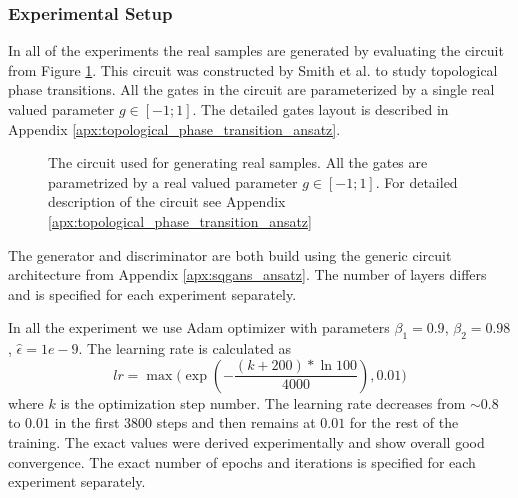 \subsubsection{Experimental Setup}
In all of the experiments the real samples are generated by evaluating the
circuit from Figure \ref{fig:phase_circuit_small}. This circuit was constructed
by Smith et al. \cite{smith2020crossing} to study topological phase transitions.
All the gates in the circuit are parameterized by a single real valued parameter
$g \in [-1;1]$. The detailed gates layout is described in Appendix \ref{apx:topological_phase_transition_ansatz}.
\begin{figure}[htbp!]
  \caption{The circuit used for generating real samples. All the gates are
    parametrized by a real valued parameter $g \in [-1; 1]$. For detailed
    description of the circuit see Appendix
    \ref{apx:topological_phase_transition_ansatz} \label{fig:phase_circuit_small}}
\end{figure}

The generator and discriminator are both build using the generic circuit
architecture from Appendix \ref{apx:sqgans_ansatz}. The number of layers differs
and is specified for each experiment separately.

In all the experiment we use Adam optimizer \cite{kingma2017adam} with
parameters $\beta_1 = 0.9$, $\beta_2=0.98$, $\hat{\epsilon} = 1e-9$. The
learning rate is calculated as
\begin{equation}
lr = \max{(\exp{(-\frac{(k+200) * \ln{100}}{4000}), 0.01)}}
\end{equation}
where $k$ is the optimization step number. The
learning rate decreases from $\sim 0.8$ to $0.01$ in the first $3800$ steps and then
remains at $0.01$ for the rest of the training. The exact values were derived
experimentally and show overall good convergence. The exact number of epochs and
iterations is specified for each experiment separately.
